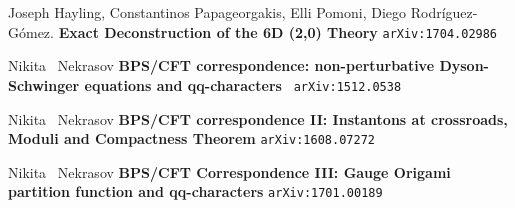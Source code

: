\documentclass[12pt]{article}
\begin{document}
\vfill

\selectfont \fontsize{12}{10}\selectfont

\begin{thebibliography}{}



\item Joseph Hayling, Constantinos Papageorgakis, Elli Pomoni, Diego Rodr\'{i}guez-G\'{o}mez. \textbf{Exact Deconstruction of the 6D (2,0) Theory} \texttt{arXiv:1704.02986}

\item Nikita \, Nekrasov \textbf{BPS/CFT correspondence: non-perturbative Dyson-Schwinger equations and qq-characters} \texttt{ arXiv:1512.0538}

\item Nikita \, Nekrasov \textbf{BPS/CFT correspondence II: Instantons at crossroads, Moduli and Compactness Theorem} \texttt{arXiv:1608.07272}

\item Nikita \, Nekrasov \textbf{BPS/CFT Correspondence III: Gauge Origami partition function and qq-characters} \texttt{arXiv:1701.00189}

\end{thebibliography}
\end{document}
